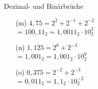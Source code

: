 \begin{exercise}{Dezimal- und Binärbrüche}
\begin{solution}
\begin{center}
\begin{minipage}{0.35\textwidth}
\begin{itemize}
\item[(m)] $4{,}75  = 2^2 + 2^{-1} + 2^{-2}$ \\ $= 100{,}11_2  = 1{,}0011_2 \cdot 10_2^{2}$
\item[(n)] $1{,}125 = 2^0 + 2^{-3}$          \\ $= 1{,}001_2   = 1{,}001_2  \cdot 10_2^{0}$
\item[(o)] $0{,}375 = 2^{-2} + 2^{-3}$       \\ $= 0{,}011_2   = 1{,}1_2    \cdot 10_2^{-2}$
\end{itemize}
\end{minipage}
\end{center}
\end{solution}

\end{exercise}
